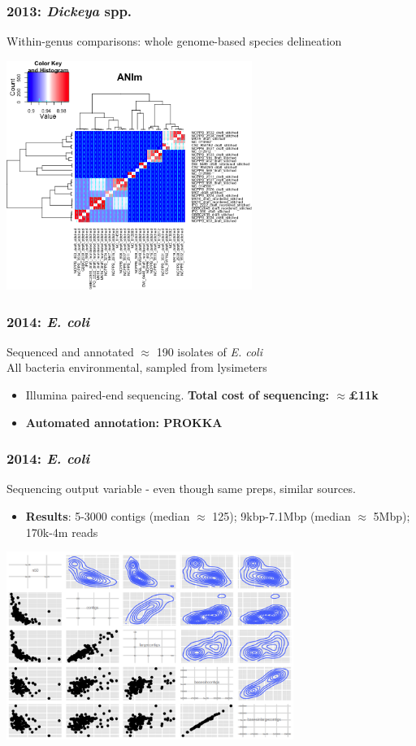 \begin{frame}
  \frametitle{2013: \textit{Dickeya} spp.}
  Within-genus comparisons: whole genome-based species delineation
  \begin{center}
    \includegraphics[width=0.6\textwidth]{images/dickeya_ani}
  \end{center}      
\end{frame}

\begin{frame}
  \frametitle{2014: \textit{E. coli}}
  Sequenced and annotated $\approx$ 190 isolates of \textit{E. coli} \\
  All bacteria environmental, sampled from lysimeters
  \begin{itemize}
    \item Illumina paired-end sequencing. \textbf{Total cost of sequencing: $\approx$\pounds11k}
    \item \textbf{Automated annotation: PROKKA}
  \end{itemize}  
\end{frame}

\begin{frame}
  \frametitle{2014: \textit{E. coli}}
  Sequencing output variable - even though same preps, similar sources.
  \begin{itemize}
    \item \textbf{Results}: 5-3000 contigs (median $\approx$ 125); 9kbp-7.1Mbp (median $\approx$ 5Mbp); 170k-4m reads
  \end{itemize}  
  \begin{center}
    \includegraphics[width=0.7\textwidth]{images/ecoli_sequencing_variation}
  \end{center}      
\end{frame}

